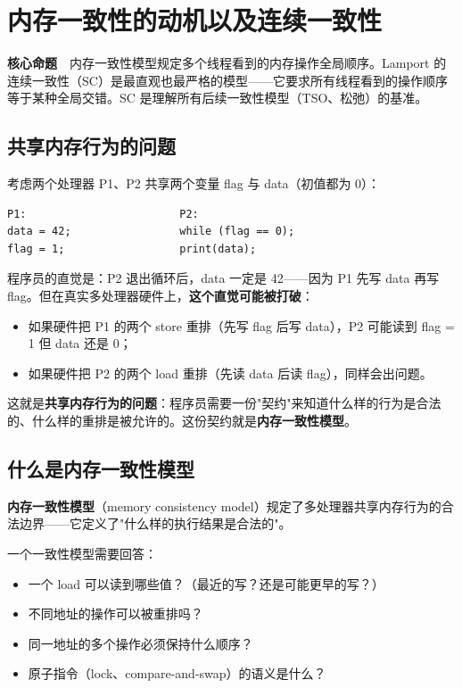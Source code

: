 \chapter{内存一致性的动机以及连续一致性}

\begin{epigraph}
\textbf{核心命题}　内存一致性模型规定多个线程看到的内存操作全局顺序。Lamport 的连续一致性（SC）是最直观也最严格的模型——它要求所有线程看到的操作顺序等于某种全局交错。SC 是理解所有后续一致性模型（TSO、松弛）的基准。
\end{epigraph}



\section{共享内存行为的问题}

考虑两个处理器 P1、P2 共享两个变量 flag 与 data（初值都为 0）：

\begin{verbatim}
P1:                        P2:
data = 42;                 while (flag == 0);
flag = 1;                  print(data);
\end{verbatim}


程序员的直觉是：P2 退出循环后，data 一定是 42——因为 P1 先写 data 再写 flag。但在真实多处理器硬件上，\textbf{这个直觉可能被打破}：

\begin{itemize}
\item 如果硬件把 P1 的两个 store 重排（先写 flag 后写 data），P2 可能读到 flag = 1 但 data 还是 0；
\item 如果硬件把 P2 的两个 load 重排（先读 data 后读 flag），同样会出问题。
\end{itemize}


这就是\textbf{共享内存行为的问题}：程序员需要一份"契约"来知道什么样的行为是合法的、什么样的重排是被允许的。这份契约就是\textbf{内存一致性模型}。

\section{什么是内存一致性模型}

\textbf{内存一致性模型}（memory consistency model）规定了多处理器共享内存行为的合法边界——它定义了"什么样的执行结果是合法的"。

一个一致性模型需要回答：

\begin{itemize}
\item 一个 load 可以读到哪些值？（最近的写？还是可能更早的写？）
\item 不同地址的操作可以被重排吗？
\item 同一地址的多个操作必须保持什么顺序？
\item 原子指令（lock、compare-and-swap）的语义是什么？
\end{itemize}


